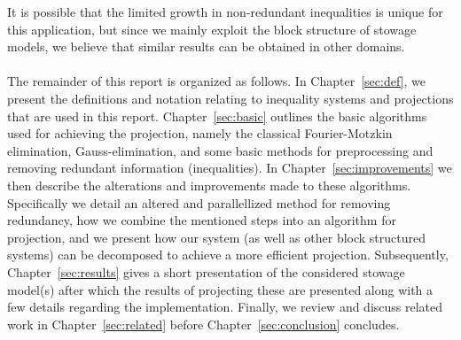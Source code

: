 It is possible that the limited growth in non-redundant inequalities is unique for this application, but since we mainly exploit the block structure of stowage models, we believe that similar results can be obtained in other domains.
\\
\\
The remainder of this report is organized as follows.
In Chapter~\ref{sec:def}, we present the definitions and notation relating to inequality systems and projections that are used in this report. 
Chapter~\ref{sec:basic} outlines the basic algorithms used for achieving the projection, namely the classical Fourier-Motzkin elimination, Gauss-elimination, and some basic methods for preprocessing and removing redundant information (inequalities). 
In Chapter~\ref{sec:improvements} we then describe the alterations and improvements made to these algorithms. Specifically we detail an altered and parallellized method for removing redundancy, how we combine the mentioned steps into an algorithm for projection, and we present how our system (as well as other block structured systems) can be decomposed to achieve a more efficient projection.    
Subsequently, Chapter~\ref{sec:results} gives a short presentation of the considered stowage model(s) after which the results of projecting these are presented along with a few details regarding the implementation. 
Finally, we review and discuss related work in Chapter~\ref{sec:related} before Chapter~\ref{sec:conclusion} concludes.